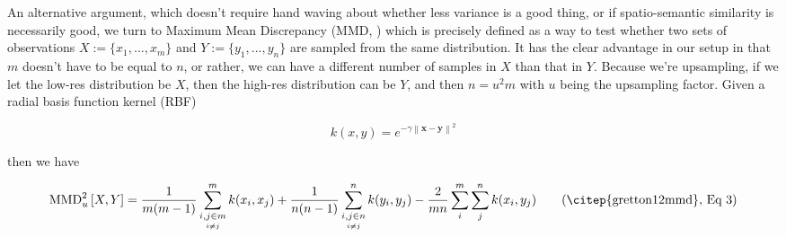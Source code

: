 An alternative argument, which doesn't require hand waving about whether less variance is a good thing, or if spatio-semantic similarity is necessarily good, we turn to Maximum Mean Discrepancy (MMD, \citep{gretton12mmd}) which is precisely defined as a way to test whether two sets of observations $X := \{x_1, ..., x_m\}$ and $Y := \{y_1, ..., y_n\}$ are sampled from the same distribution. It has the clear advantage in our setup in that $m$ doesn't have to be equal to $n$, or rather, we can have a different number of samples in $X$ than that in $Y$. Because we're upsampling, if we let the low-res distribution be $X$, then the high-res distribution can be $Y$, and then $n = u^2m$ with $u$ being the upsampling factor. Given a radial basis function kernel (RBF)

\begin{equation}
    k(x,y) = e^{-\gamma \left\lVert\mathbf{x} - \mathbf{y}\right\rVert^2}
\end{equation}

then we have 

\begin{equation}
    \text{MMD}_u^2\left[X,Y\right] = \frac{1}{m(m-1)} \sum_{\underset{i \neq j}{i,j \in m}}^m k(x_i,x_j) + \frac{1}{n(n-1)} \sum_{\underset{i \neq j}{i,j \in n}}^n k(y_i,y_j) - \frac{2}{mn} \sum_i^m \sum_j^n k(x_i,y_j)
    \tag{\citep{gretton12mmd}, Eq 3}
\end{equation}

